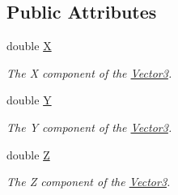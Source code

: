 \subsection*{Public Attributes}
\begin{DoxyCompactItemize}
\item 
double \hyperlink{struct_open_t_k_1_1_vector3d_a1259c1afde67e1518d723d9e150c9c9e}{X}
\begin{DoxyCompactList}\small\item\em The X component of the \hyperlink{struct_open_t_k_1_1_vector3}{Vector3}. \end{DoxyCompactList}\item 
double \hyperlink{struct_open_t_k_1_1_vector3d_a8cb2eeeb8cf190e7aeab39af66a2ec5e}{Y}
\begin{DoxyCompactList}\small\item\em The Y component of the \hyperlink{struct_open_t_k_1_1_vector3}{Vector3}. \end{DoxyCompactList}\item 
double \hyperlink{struct_open_t_k_1_1_vector3d_a894d99bd161ab4ad52a45702f48641d5}{Z}
\begin{DoxyCompactList}\small\item\em The Z component of the \hyperlink{struct_open_t_k_1_1_vector3}{Vector3}. \end{DoxyCompactList}\end{DoxyCompactItemize}
